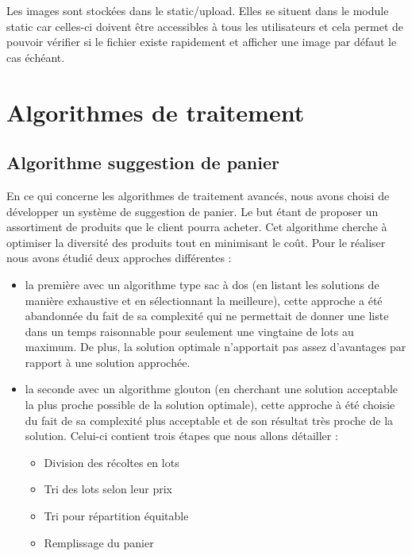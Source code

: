 \documentclass[12pt,titlepage]{report}
\begin{document}
Les images sont stockées dans le static/upload. Elles se situent dans le module static car celles-ci doivent être accessibles à tous les utilisateurs et cela permet de pouvoir vérifier si le fichier existe rapidement et afficher une image par défaut le cas échéant.


\chapter{Algorithmes de traitement}

\section{Algorithme suggestion de panier}

En ce qui concerne les algorithmes de traitement avancés, nous avons choisi de développer un système de suggestion de panier. 
Le but étant de proposer un assortiment de produits que le client pourra acheter. Cet algorithme cherche à optimiser la diversité des produits tout en minimisant le coût. Pour le réaliser nous avons étudié deux approches différentes : \\

\begin{itemize}
    \item la première avec un algorithme type sac à dos (en listant les solutions de manière exhaustive et en sélectionnant la meilleure), cette approche a été abandonnée du fait de sa complexité qui ne permettait de donner une liste dans un temps raisonnable pour seulement une vingtaine de lots au maximum. De plus, la solution optimale n’apportait pas assez d’avantages par rapport à une solution approchée.

    \item la seconde avec un algorithme glouton (en cherchant une solution acceptable la plus proche possible de la solution optimale), cette approche à été choisie du fait de sa complexité plus acceptable et de son résultat très proche de la solution. Celui-ci contient trois étapes que nous allons détailler :
    \begin{itemize}
        \item Division des récoltes en lots
        \item Tri des lots selon leur prix
        \item Tri pour répartition équitable
        \item Remplissage du panier
    \end{itemize}
\end{itemize}
\end{document}

